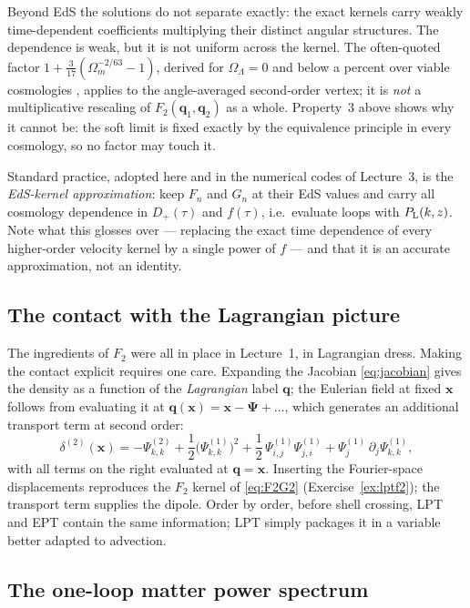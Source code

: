 \documentclass[a4paper,11pt]{article}
\newcommand{\vx}{\bm{x}}
\newcommand{\vq}{\bm{q}}
\newcommand{\vPsi}{\bm{\Psi}}
\def\Plin{P_{\rm L}}
\def\Om{\Omega_m}
\numberwithin{equation}{section}
\begin{document}
Beyond EdS the solutions do not separate exactly: the exact kernels carry weakly time-dependent coefficients multiplying their distinct angular structures. The dependence is weak, but it is not uniform across the kernel. The often-quoted factor $1 + \tfrac{3}{17}(\Om^{-2/63}-1)$, derived for $\Omega_\Lambda = 0$ and below a percent over viable cosmologies \cite[\S 2.4.4]{Bernardeau2002}, applies to the angle-averaged second-order vertex; it is \emph{not} a multiplicative rescaling of $F_2(\vq_1,\vq_2)$ as a whole. Property~3 above shows why it cannot be: the soft limit is fixed exactly by the equivalence principle in every cosmology, so no factor may touch it.

Standard practice, adopted here and in the numerical codes of Lecture~3, is the \emph{EdS-kernel approximation}: keep $F_n$ and $G_n$ at their EdS values and carry all cosmology dependence in $D_+(\tau)$ and $f(\tau)$, i.e.\ evaluate loops with $\Plin(k,z)$. Note what this glosses over --- replacing the exact time dependence of every higher-order velocity kernel by a single power of $f$ --- and that it is an accurate approximation, not an identity.

\subsection{The contact with the Lagrangian picture}
\label{sec:lpt_ept}

The ingredients of $F_2$ were all in place in Lecture~1, in Lagrangian dress.
Making the contact explicit requires one care. Expanding the Jacobian \eqref{eq:jacobian} gives the density as a function of the \emph{Lagrangian} label $\vq$; the Eulerian field at fixed $\vx$ follows from evaluating it at $\vq(\vx) = \vx - \vPsi + \ldots$, which generates an additional transport term at second order:
\begin{equation}
\delta^{(2)}(\vx) = -\Psi^{(2)}_{k,k}
+ \frac12\big(\Psi^{(1)}_{k,k}\big)^2
+ \frac12\,\Psi^{(1)}_{i,j}\Psi^{(1)}_{j,i}
+ \Psi^{(1)}_{j}\,\partial_j\Psi^{(1)}_{k,k} ,
\label{eq:delta2_lpt}
\end{equation}
with all terms on the right evaluated at $\vq = \vx$. Inserting the Fourier-space displacements reproduces the $F_2$ kernel of \eqref{eq:F2G2} (Exercise~\ref{ex:lptf2}); the transport term supplies the dipole. Order by order, before shell crossing, LPT and EPT contain the same information; LPT simply packages it in a variable better adapted to advection.

\subsection{The one-loop matter power spectrum}
\label{sec:1loopmatter}
\end{document}
